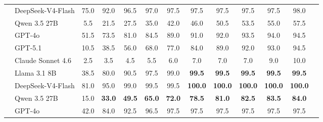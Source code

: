 \begin{table}[htbp]
{\begin{tabular}{llccccccccccc}
                                 & DeepSeek-V4-Flash & 75.0                       & 92.0          & 96.5           & 97.0           & 97.5           & 97.5           & 97.5           & 97.5           & 97.5           & 98.0           \\
                                 & Qwen 3.5 27B      & 5.5                        & 21.5          & 27.5           & 35.0           & 42.0           & 46.0           & 50.5           & 53.5           & 55.0           & 57.5           \\
                                 & GPT-4o            & 51.5                       & 73.5          & 81.0           & 84.5           & 89.0           & 91.0           & 92.0           & 93.5           & 94.0           & 94.5           \\
                                 & GPT-5.1           & 10.5                       & 38.5          & 56.0           & 68.0           & 77.0           & 84.0           & 89.0           & 92.0           & 93.0           & 94.5           \\
                                 & Claude Sonnet 4.6 & 2.5                        & 3.5           & 4.5            & 5.5            & 6.0            & 7.0            & 7.0            & 7.0            & 9.0            & 10.0           \\
                  \midrule
                                 & Llama 3.1 8B      & 38.5                       & 80.0          & 90.5           & 97.5           & 99.0           & \textbf{99.5}  & \textbf{99.5}  & \textbf{99.5}  & \textbf{99.5}  & \textbf{99.5}  \\
                                 & DeepSeek-V4-Flash & 81.0                       & 95.0          & 99.0           & 99.5           & 99.5           & \textbf{100.0} & \textbf{100.0} & \textbf{100.0} & \textbf{100.0} & \textbf{100.0} \\
                                 & Qwen 3.5 27B      & 15.0                       & \textbf{33.0} & \textbf{49.5}  & \textbf{65.0}  & \textbf{72.0}  & \textbf{78.5}  & \textbf{81.0}  & \textbf{82.5}  & \textbf{83.5}  & \textbf{84.0}  \\
                                 & GPT-4o            & 42.0                       & 84.0          & 92.5           & 96.5           & 97.5           & 97.5           & 97.5           & 97.5           & 97.5           & 97.5           \\

\end{tabular}}
\end{table}
